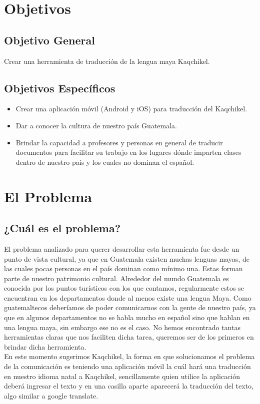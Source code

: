 \documentclass[a4paper,openright,11pt]{article}
\begin{document}
\section{Objetivos}
\subsection{Objetivo General}
Crear una herramienta de traducci\'on de la lengua maya Kaqchikel.
\subsection{Objetivos Espec\'ificos}
\begin{itemize}
    \item Crear una aplicaci\'on m\'ovil (Android y iOS) para traducción del Kaqchikel.
    \item Dar a conocer la cultura de nuestro pa\'is Guatemala.
    \item Brindar la capacidad a profesores y personas en general de traducir documentos para facilitar su trabajo en los lugares d\'onde imparten clases dentro de nuestro pa\'is y los cuales no dominan el espa\~nol.
\end{itemize}
\newpage

\section{El Problema}
\subsection{¿Cuál es el problema?}
El problema analizado para querer desarrollar esta herramienta fue desde un punto de vista cultural, ya que en Guatemala existen muchas lenguas mayas, de las cuales pocas personas en el pa\'is dominan como m\'inimo una. Estas forman parte de nuestro patrimonio cultural. Alrededor del mundo Guatemala es conocida por los puntos tur\'isticos con los que contamos, regularmente estos se encuentran en los departamentos donde al menos existe una lengua Maya.  Como guatemaltecos deber\'iamos de poder comunicarnos con la gente de nuestro pa\'is, ya que en algunos departamentos no se habla mucho en espa\~nol sino que hablan en una lengua maya, sin embargo ese no es el caso. No hemos encontrado tantas herramientas claras que nos faciliten dicha tarea, queremos ser de los primeros en brindar dicha herramienta.\\

En este momento sugerimos Kaqchikel, la forma en que solucionamos el problema de la comunicación es teniendo una aplicación m\'ovil la cu\'al har\'a una traducción en nuestro idioma natal a Kaqchikel, sencillamente quien utilice la aplicación deberá ingresar el texto y en una casilla aparte aparecer\'a la traducci\'on del texto, algo similar a google translate.\\
\end{document}

